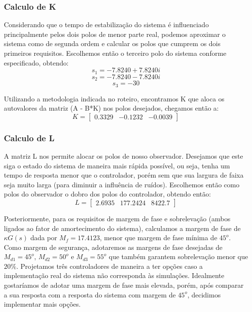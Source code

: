 \documentclass{article}
\begin{document}
\subsubsection{Calculo de K}
Considerando que o tempo de estabilização do sistema é influenciado principalmente pelos dois polos de menor parte real, podemos aproximar o sistema como de segunda ordem e calcular os polos que cumprem os dois primeiros requisitos. Escolhemos então o terceiro polo do sistema conforme especificado, obtendo:
\begin{equation}
	s_1=-7.8240 + 7.8240i
\end{equation}
\begin{equation}
	s_2=-7.8240 - 7.8240i
\end{equation}
\begin{equation}
	s_3=-30
\end{equation}

Utilizando a metodologia indicada no roteiro\cite{bb:roteiro}, encontramos K que aloca os autovalores da matriz (A - B*K) nos polos desejados, chegamos então a: 
\begin{equation}
\label{eq:matk}
K=
\begin{bmatrix}
0.3329 & -0.1232 & -0.0039
\end{bmatrix}
\end{equation}

\subsubsection{Calculo de L}
A matriz L nos permite alocar os polos de nosso observador. Desejamos que este siga o estado do sistema de maneira mais rápida possível, ou seja, tenha um tempo de resposta menor que o controlador, porém sem que sua largura de faixa seja muito larga (para diminuir a influência de ruídos). Escolhemos então como polos do observador o dobro dos polos do controlador, obtendo então:
\begin{equation}
\label{eq:matl}
L=
\begin{bmatrix}
2.6935 & 177.2424 & 8422.7
\end{bmatrix}
\end{equation}

Posteriormente, para os requisitos de margem de fase e sobrelevação (ambos ligados ao fator de amortecimento do sistema), calculamos a margem de fase de $\kappa G(s)$ dada por $M_f=17.4123$, menor que margem de fase mínima de $45^o$. Como margem de segurança, adotaremos as margens de fase desejadas de $M_{d1}=45^o$, $M_{d2}=50^o$ e $M_{d3}=55^o$ que também garantem sobrelevação menor que $20\%$. Projetamos três controladores de maneira a ter opções caso a implementação real do sistema não corresponda às simulações. Idealmente gostaríamos de adotar uma margem de fase mais elevada, porém, após comparar a sua resposta com a resposta do sistema com margem de $45^o$, decidimos implementar mais opções.
\end{document}

